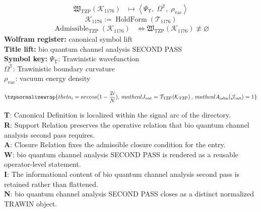 \noindent
\begin{minipage}[t]{0.48\linewidth}
\begingroup
\small
\[
\begin{aligned}
\mathfrak{W}_{\mathrm{TZP}}\!\left(\mathcal{K}_{1176}\right)
&\longmapsto
\left\langle \Psi_{\mathrm{T}},\; \Omega^{\mathbb{T}},\; \rho_{\mathrm{vac}} \right\rangle
\end{aligned}
\]
\[
\mathcal{K}_{1176}
:=
\operatorname{HoldForm}\!\left(\mathcal{T}_{1176}\right)
\]
\[
\begin{aligned}
\operatorname{Admissible}_{\mathrm{TZP}}\!\left(\mathcal{K}_{1176}\right)
&\Longleftrightarrow
\mathfrak{W}_{\mathrm{TZP}}\!\left(\mathcal{K}_{1176}\right)\not\equiv\varnothing
\end{aligned}
\]
\textbf{Wolfram register:} canonical symbol lift\\
\textbf{Title lift:} bio quantum channel analysis SECOND PASS\\
\textbf{Symbol key:} \(\Psi_{\mathrm{T}}\): Trawinistic wavefunction\\ \(\Omega^{\mathbb{T}}\): Trawinistic boundary curvature\\ \(\rho_{\mathrm{vac}}\): vacuum energy density
\par
\endgroup
\end{minipage}\hfill
\begin{minipage}[t]{0.48\linewidth}
\[
\tzpnormalizewrap{theta_{i}=arccos(1-\frac{2i}{N}),\,mathcal{J}_{\mathrm{out}} = \mathcal{T}_{\mathrm{TZP}}\!\left(\mathcal{K}_{\mathrm{TZP}}\right),\,mathcal{A}_{\mathrm{adm}}\!\left(\mathcal{J}_{\mathrm{out}}\right)=1}
\]

\small
\textbf{T}: Canonical Definition is localized within the signal arc of the directory.\\
\textbf{R}: Support Relation preserves the operative relation that bio quantum channel analysis second pass requires.\\
\textbf{A}: Closure Relation fixes the admissible closure condition for the entry.\\
\textbf{W}: bio quantum channel analysis SECOND PASS is rendered as a reusable operator-level statement.\\
\textbf{I}: The informational content of bio quantum channel analysis second pass is retained rather than flattened.\\
\textbf{N}: bio quantum channel analysis SECOND PASS closes as a distinct normalized TRAWIN object.
\normalsize
\end{minipage}

